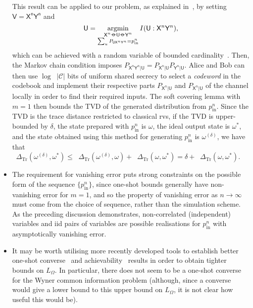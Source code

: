 \documentclass[10pt, a4paper]{article}
\numberwithin{equation}{section} %
\theoremstyle{definition}
\theoremstyle{plain}
\DeclareMathOperator*{\argmin}{argmin}
\newcommand{\abs}[1]{\mathop{}\left\lvert#1\right\rvert}
\newcommand{\?}{\mathrel{?}} %
\newcommand*\markov{\mathrel{\ooalign{\hidewidth$\circ$\hidewidth\cr$-$\cr}}} %
\newcommand{\Trdist}[2]{\mathop{}\Delta_\mathrm{Tr}\left(#1, #2\right)}
\newcommand{\crv}[1]{\mathsf{#1}}
\newcommand{\prin}[1][p]{#1_{\mathrm{in}}}
\begin{document}
\begin{itemize}
        This result can be applied to our problem, as explained in~\cite[Sec. V-B]{CorrReview}, by setting \(\crv{V} = \crv{X^n Y^n}\) and 
        \begin{equation}
        \crv{U} = \argmin_{\substack{
        \crv{X}^n \markov \crv{U} \markov \crv{Y}^n \\
        \sum_u P_{\crv{U}\crv{X}^n\crv{Y}^n} = \prin^n
      }
      } I(\crv{U}:\crv{X}^n\crv{Y}^n),
        \end{equation}
        which can be achieved with a random variable of bounded cardinality~\cite[Sec. VI.A]{DistrChanSynth}. Then, the Markov chain condition imposes \(P_{\crv{X}^n\crv{Y}^n|\crv{U}} = P_{\crv{X}^n|\crv{U}} P_{\crv{Y}^n|\crv{U}}\). Alice and Bob can then use \(\log \abs{\mathcal{C}}\) bits of uniform shared secrecy to select a \emph{codeword} in the codebook and implement their respective parts \(P_{\crv{X}^n|\crv{U}}\) and \(P_{\crv{X}^n|\crv{U}}\) of the channel locally in order to find their required inputs. The soft covering lemma with \(m=1\) then bounds the TVD of the generated distribution from \(\prin^n\). Since the TVD is the trace distance restricted to classical rvs, if the TVD is upper-bounded by \(\delta\), the state prepared with \(\prin^n\) is \(\omega\), the ideal output state is \(\omega^*\), and the state obtained using this method for generating \(\prin^n\) is \(\omega^{(\delta)}\), we have that \(\Trdist{\omega^{(\delta)}}{\omega^*} \leq \Trdist{\omega^{(\delta)}}{\omega} + \Trdist{\omega}{\omega^*} = \delta + \Trdist{\omega}{\omega^*}\).
      \item The requirement for vanishing error puts strong constraints on the possible form of the sequence \(\{\prin^n\}\), since one-shot bounds generally have non-vanishing error for \(m=1\), and so the property of vanishing error as \(n\to\infty\) must come from the choice of sequence, rather than the simulation scheme. As the preceding discussion demonstrates, non-correlated (independent) variables and iid pairs of variables are possible realisations for \(\prin^n\) with asymptotically vanishing error.
      \item It may be worth utilising more recently developed tools to establish better one-shot converse~\cite{BLIneqStrongConv} and achievability~\cite{PoissonMatch} results in order to obtain tighter bounds on \(L_{\Omega}\). In particular, there does not seem to be a one-shot converse for the Wyner common information problem (although, since a converse would give a lower bound to this upper bound on \(L_{\Omega}\), it is not clear how useful this would be).
    \end{itemize}
\end{document}
